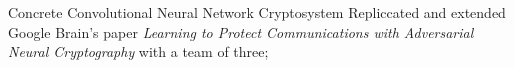 \project
    {Concrete Convolutional Neural Network Cryptosystem}
    {
        Repliccated and extended Google Brain's paper \textit{Learning to Protect Communications
        with Adversarial Neural Cryptography} with a team of three;
    }
